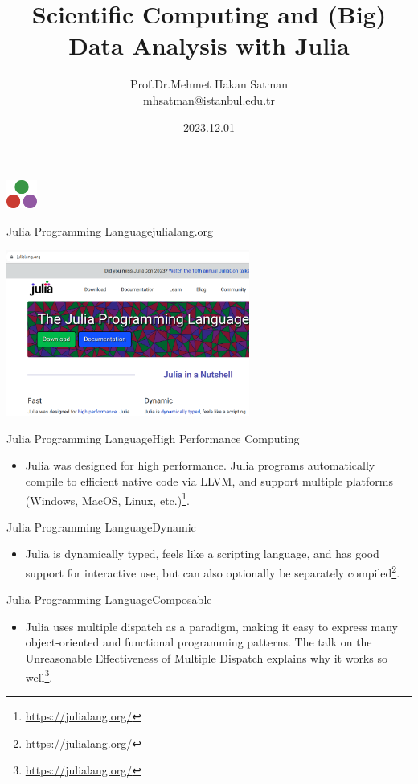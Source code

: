 \documentclass[11pt]{beamer}
\author{Prof.Dr.Mehmet Hakan Satman \\ mhsatman@istanbul.edu.tr}
\title{Scientific Computing and (Big) Data Analysis with Julia}
\institute{Istanbul University}
\date{2023.12.01}
\begin{document}
\begin{frame}
\includegraphics[width=1cm]{images/julia.png}
\titlepage
\end{frame}

\begin{frame}[fragile]{Julia Programming Language}{julialang.org}
	\begin{center}
		\includegraphics[width=8cm]{images/thesite.png}
	\end{center}
\end{frame}


\begin{frame}[fragile]{Julia Programming Language}{High Performance Computing}
\begin{itemize}
	\item Julia was designed for high performance. Julia programs automatically compile to efficient native code via LLVM, and support multiple platforms (Windows, MacOS, Linux, etc.)\footnote{\url{https://julialang.org/}}.
\end{itemize}
\end{frame}


\begin{frame}[fragile]{Julia Programming Language}{Dynamic}
	\begin{itemize}
		\item Julia is dynamically typed, feels like a scripting language, and has good support for interactive use, but can also optionally be separately compiled\footnote{\url{https://julialang.org/}}.
	\end{itemize}
\end{frame}


\begin{frame}[fragile]{Julia Programming Language}{Composable}
	\begin{itemize}
		\item Julia uses multiple dispatch as a paradigm, making it easy to express many object-oriented and functional programming patterns. The talk on the Unreasonable Effectiveness of Multiple Dispatch explains why it works so well\footnote{\url{https://julialang.org/}}.
	\end{itemize}
\end{frame}
\end{document}
